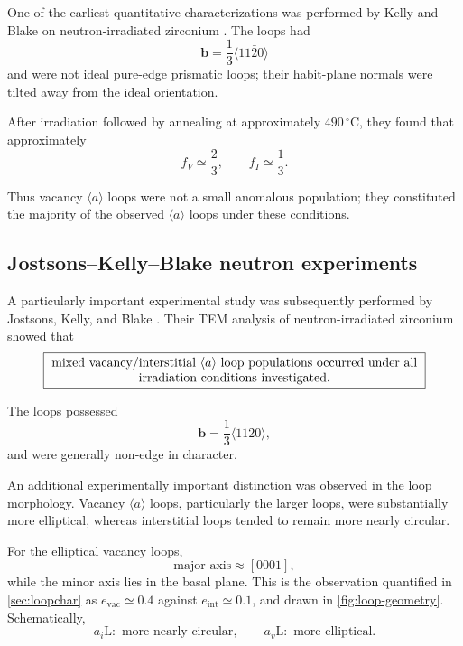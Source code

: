 \documentclass{article}
\newcommand{\aloop}{\ensuremath{\langle a\rangle}}
\newcommand{\aiL}{a_{i}\mathrm{L}}
\newcommand{\avL}{a_{v}\mathrm{L}}
\newcommand{\bvec}{\bm b}
\begin{document}
One of the earliest quantitative characterizations was performed by Kelly and
Blake on neutron-irradiated zirconium \citep{kelly1973characterization}. The
loops had
\begin{equation}
    \bvec
    =
    \frac{1}{3}\langle11\bar20\rangle
\end{equation}
and were not ideal pure-edge prismatic loops; their habit-plane normals were
tilted away from the ideal orientation.

After irradiation followed by annealing at approximately
$490\,^{\circ}\mathrm C$, they found that approximately
\begin{equation}
    \boxed{
    f_V \simeq \frac{2}{3},
    \qquad
    f_I \simeq \frac{1}{3}.
    }
\end{equation}

Thus vacancy \aloop{} loops were not a small anomalous population; they
constituted the majority of the observed \aloop{} loops under these conditions.

\subsection{Jostsons--Kelly--Blake neutron experiments}

A particularly important experimental study was subsequently performed by
Jostsons, Kelly, and Blake \citep{jostsons1977nature}. Their TEM analysis of
neutron-irradiated zirconium showed that
\begin{equation}
    \boxed{\parbox{0.86\textwidth}{\centering mixed vacancy/interstitial
    \aloop{} loop populations occurred under all irradiation conditions
    investigated.}}
\end{equation}

The loops possessed
\begin{equation}
    \bvec
    =
    \frac13\langle11\bar20\rangle,
\end{equation}
and were generally non-edge in character.

An additional experimentally important distinction was observed in the loop
morphology. Vacancy \aloop{} loops, particularly the larger loops, were
substantially more elliptical, whereas interstitial loops tended to remain more
nearly circular.

For the elliptical vacancy loops,
\begin{equation}
    \text{major axis}\approx[0001],
\end{equation}
while the minor axis lies in the basal plane. This is the observation quantified
in \cref{sec:loopchar} as $e_{\mathrm{vac}}\simeq0.4$ against
$e_{\mathrm{int}}\simeq0.1$, and drawn in \cref{fig:loop-geometry}.
Schematically,
\begin{equation}
    \boxed{
    \aiL:
    \text{ more nearly circular},
    \qquad
    \avL:
    \text{ more elliptical}.
    }
\end{equation}
\end{document}
